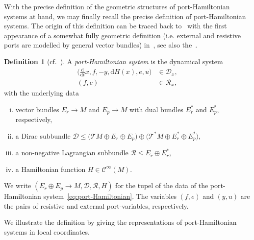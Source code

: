 \documentclass[preprint,12pt]{elsarticle}
\theoremstyle{definition}
\newtheorem{definition}[theorem]{Definition}
\begin{document}
With the precise definition of the geometric structures of port-Hamiltonian systems at hand, we may finally recall the precise definition of port-Hamiltonian systems. The origin of this definition can be traced back to~\cite{DalsvdS98} with the first appearance of a somewhat fully geometric definition (i.e. external and resistive ports are modelled by general vector bundles) in~\cite{Merk09}, see also the~\cite{SchaftJeltsema14}.

\begin{definition}[cf.~\cite{SchaftJeltsema14,Merk09}]\label{def:port-Hamiltonian}
A \textit{port-Hamiltonian system} is the dynamical system
\begin{equation}\label{eq:port-Hamiltonian}
\begin{aligned}
\big(\tfrac{\mathrm{d}}{\mathrm{d}t}x,f,-y,\mathrm{d}H(x),e,u\big) & \in\mathcal{D}_x,\\
(f,e) & \in\mathcal{R}_x,
\end{aligned}
\end{equation}
with the underlying data
\begin{enumerate}[(i)]
\item vector bundles $E_r\to M$ and $E_p\to M$ with dual bundles $E_r^*$ and $E_p^*$, respectively,
\item a Dirac subbundle $\mathcal{D}\leq \big(\mathcal{T}M\oplus E_r\oplus E_p\big)\oplus\big(\mathcal{T}^*M\oplus E_r^*\oplus E_p^*\big)$,
\item a non-negative Lagrangian subbundle $\mathcal{R}\leq E_r\oplus E_r^*$,
\item a Hamiltonian function $H\in\mathcal{C}^\infty(M)$.
\end{enumerate}
We write $(E_r\oplus E_p\to M,\mathcal{D},\mathcal{R},H)$ for the tupel of the data of the port-Hamiltonian system~\eqref{eq:port-Hamiltonian}. The variables $(f,e)$ and $(y,u)$ are the pairs of resistive and external port-variables, respectively.
\end{definition}

We illustrate the definition by giving the representations of port-Hamiltonian systems in local coordinates.
\end{document}
